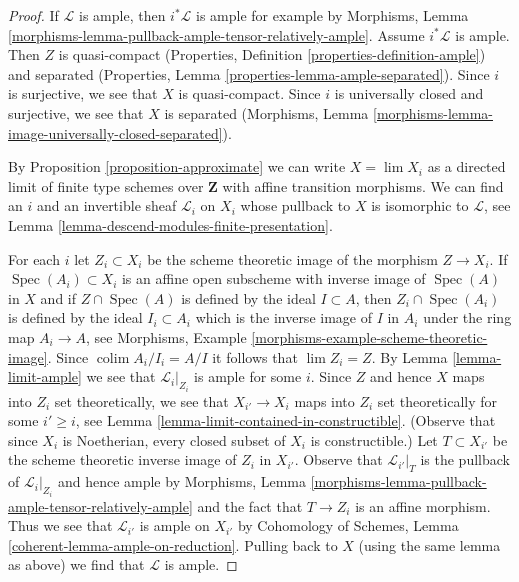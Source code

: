 \documentclass[10pt,a4paper]{amsart}
\theoremstyle{plain}
\theoremstyle{definition}
\theoremstyle{remark}
\numberwithin{equation}{subsection}
\def\lim{\mathop{\mathrm{lim}}\nolimits}
\def\colim{\mathop{\mathrm{colim}}\nolimits}
\def\Spec{\mathop{\mathrm{Spec}}}
\begin{document}
\begin{proof}
If $\mathcal{L}$ is ample, then $i^*\mathcal{L}$ is ample for
example by Morphisms, Lemma
\ref{morphisms-lemma-pullback-ample-tensor-relatively-ample}.
Assume $i^*\mathcal{L}$ is ample. Then $Z$ is quasi-compact
(Properties, Definition \ref{properties-definition-ample})
and separated
(Properties, Lemma \ref{properties-lemma-ample-separated}).
Since $i$ is surjective, we see that $X$ is quasi-compact.
Since $i$ is universally closed and surjective, we see that
$X$ is separated (Morphisms, Lemma
\ref{morphisms-lemma-image-universally-closed-separated}).

\medskip\noindent
By Proposition \ref{proposition-approximate} we can write
$X = \lim X_i$ as a directed limit of finite type schemes over $\mathbf{Z}$
with affine transition morphisms. We can find an $i$ and an invertible
sheaf $\mathcal{L}_i$ on $X_i$ whose pullback to $X$ is isomorphic to
$\mathcal{L}$, see Lemma \ref{lemma-descend-modules-finite-presentation}.

\medskip\noindent
For each $i$ let $Z_i \subset X_i$ be the scheme theoretic image
of the morphism $Z \to X_i$. If $\Spec(A_i) \subset X_i$ is an affine
open subscheme with inverse image of $\Spec(A)$ in $X$ and if
$Z \cap \Spec(A)$ is defined by the ideal $I \subset A$, then
$Z_i \cap \Spec(A_i)$ is defined by the ideal $I_i \subset A_i$
which is the inverse image of $I$ in $A_i$ under the ring map
$A_i \to A$, see
Morphisms, Example \ref{morphisms-example-scheme-theoretic-image}.
Since $\colim A_i/I_i = A/I$ it follows that $\lim Z_i = Z$.
By Lemma \ref{lemma-limit-ample} we see that $\mathcal{L}_i|_{Z_i}$
is ample for some $i$. Since $Z$ and hence $X$ maps into $Z_i$
set theoretically, we see that $X_{i'} \to X_i$ maps into $Z_i$
set theoretically for some $i' \geq i$, see
Lemma \ref{lemma-limit-contained-in-constructible}.
(Observe that since $X_i$ is Noetherian, every closed subset
of $X_i$ is constructible.) Let $T \subset X_{i'}$
be the scheme theoretic inverse image of $Z_i$ in $X_{i'}$.
Observe that $\mathcal{L}_{i'}|_T$ is the pullback
of $\mathcal{L}_i|_{Z_i}$ and hence ample by
Morphisms, Lemma \ref{morphisms-lemma-pullback-ample-tensor-relatively-ample}
and the fact that $T \to Z_i$ is an affine morphism.
Thus we see that $\mathcal{L}_{i'}$ is ample on $X_{i'}$
by Cohomology of Schemes, Lemma \ref{coherent-lemma-ample-on-reduction}.
Pulling back to $X$ (using the same lemma as above)
we find that $\mathcal{L}$ is ample.
\end{proof}
\end{document}
